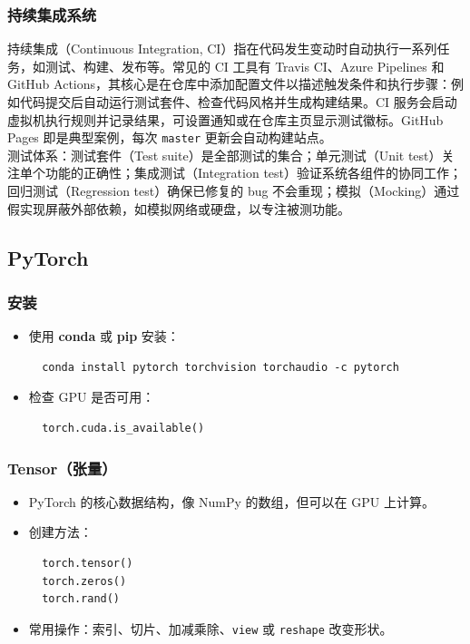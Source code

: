 \documentclass[a4paper,12pt]{ctexart}
\begin{document}
\subsubsection{持续集成系统}

持续集成（Continuous Integration, CI）指在代码发生变动时自动执行一系列任务，如测试、构建、发布等。常见的 CI 工具有 Travis CI、Azure Pipelines 和 GitHub Actions，其核心是在仓库中添加配置文件以描述触发条件和执行步骤：例如代码提交后自动运行测试套件、检查代码风格并生成构建结果。CI 服务会启动虚拟机执行规则并记录结果，可设置通知或在仓库主页显示测试徽标。GitHub Pages 即是典型案例，每次 \texttt{master} 更新会自动构建站点。\\

测试体系：测试套件（Test suite）是全部测试的集合；单元测试（Unit test）关注单个功能的正确性；集成测试（Integration test）验证系统各组件的协同工作；回归测试（Regression test）确保已修复的 bug 不会重现；模拟（Mocking）通过假实现屏蔽外部依赖，如模拟网络或硬盘，以专注被测功能。


\subsection{PyTorch}

\subsubsection{安装}
\begin{itemize}
  \item 使用 \textbf{conda} 或 \textbf{pip} 安装：
  \begin{verbatim}
  conda install pytorch torchvision torchaudio -c pytorch
  \end{verbatim}
  \item 检查 GPU 是否可用：
  \begin{verbatim}
  torch.cuda.is_available()
  \end{verbatim}
\end{itemize}


\subsubsection{Tensor（张量）}
\begin{itemize}
  \item PyTorch 的核心数据结构，像 NumPy 的数组，但可以在 GPU 上计算。
  \item 创建方法：
  \begin{verbatim}
  torch.tensor()
  torch.zeros()
  torch.rand()
  \end{verbatim}
  \item 常用操作：索引、切片、加减乘除、\texttt{view} 或 \texttt{reshape} 改变形状。
\end{itemize}
\end{document}
